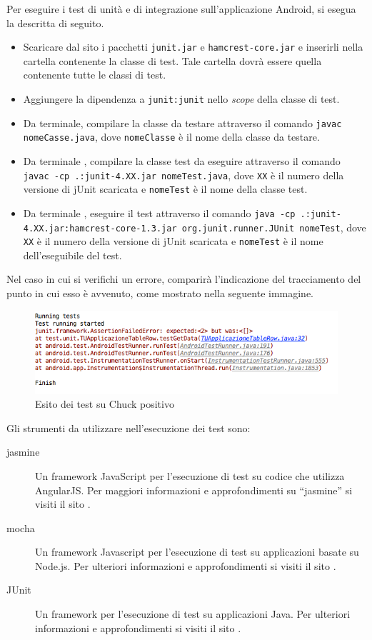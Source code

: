 				Per eseguire i test di unità e di integrazione sull'applicazione Android, si esegua la  descritta di seguito.
				\begin{itemize}
					\item Scaricare dal sito  i pacchetti \texttt{junit.jar} e \texttt{hamcrest-core.jar} e inserirli nella cartella contenente la classe di test. Tale cartella dovrà essere quella contenente tutte le classi di test.
					\item Aggiungere la dipendenza a \texttt{junit:junit} nello \textit{scope} della classe di test.
					\item Da terminale, compilare la classe da testare attraverso il comando \texttt{javac nomeCasse.java}, dove \texttt{nomeClasse} è il nome della classe da testare.
					\item Da terminale , compilare la classe test da eseguire attraverso il comando \texttt{javac -cp .:junit-4.XX.jar nomeTest.java}, dove \texttt{XX} è il numero della versione di jUnit scaricata e \texttt{nomeTest} è il nome della classe test.
					\item Da terminale , eseguire il test attraverso il comando \texttt{java -cp .:junit-4.XX.jar:hamcrest-core-1.3.jar org.junit.runner.JUnit nomeTest}, dove \texttt{XX} è il numero della versione di jUnit scaricata e \texttt{nomeTest} è il nome dell'eseguibile del test.
				\end{itemize}
				Nel caso in cui si verifichi un errore, comparirà l'indicazione del tracciamento del punto in cui esso è avvenuto, come mostrato nella seguente immagine.
					\begin{figure}[H]
						\centering
							\includegraphics[scale=0.5]{Pics/JUnitTestFail.png}
						\caption{Esito dei test su Chuck positivo}
					\end{figure}
				
			Gli strumenti da utilizzare nell'esecuzione dei test sono:
			\begin{description}
				\item[jasmine] Un framework JavaScript per l'esecuzione di test su codice che utilizza AngularJS.  Per maggiori informazioni e approfondimenti su “jasmine” si visiti il sito .
				\item[mocha] Un framework Javascript per l'esecuzione di test su applicazioni basate su Node.js. Per ulteriori informazioni e approfondimenti si visiti il sito .
				\item[JUnit] Un framework per l'esecuzione di test su applicazioni Java. Per ulteriori informazioni e approfondimenti si visiti il sito .
			\end{description}
			
